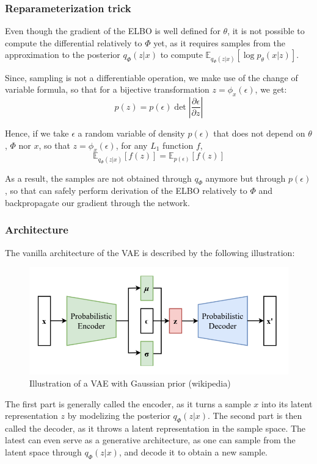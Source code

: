 \subsubsection{Reparameterization trick}

Even though the gradient of the ELBO is well defined for $\theta$, it is not possible to compute the differential relatively to $\Phi$ yet, as it requires samples from the approximation to the posterior $q_{\Phi}(z|x)$ to compute $\mathbb{E}_{q_{\Phi}(z|x)}[\log p_{\theta}(x|z)]$.
\medskip

Since, sampling is not a differentiable operation, we make use of the change of variable formula, so that for a bijective transformation $z = \phi_x(\epsilon)$, we get:
$$
p(z) = p(\epsilon) \det \left| \frac{\partial \epsilon}{\partial z}\right|
$$

Hence, if we take $\epsilon$ a random variable of density $p(\epsilon)$ that does not depend on $\theta$, $\Phi$ nor $x$, so that $z = \phi_x(\epsilon)$, for any $L_1$ function $f$,
$$
\mathbb{E}_{q_{\Phi}(z|x)}[f(z)] = \mathbb{E}_{p(\epsilon)}[f(z)]
$$

As a result, the samples are not obtained through $q_{\Phi}$ anymore but through $p(\epsilon)$, so that can safely perform derivation of the ELBO relatively to $\Phi$ and backpropagate our gradient through the network.

\subsubsection{Architecture}

The vanilla architecture of the VAE is described by the following illustration:

\begin{figure}[H]
    \centering
    \includegraphics[width=.7\textwidth]{images/Reparameterized_Variational_Autoencoder}
    \caption{Illustration of a VAE with Gaussian prior (wikipedia)}
    \label{fig:vae_architecture}
\end{figure}

The first part is generally called the encoder, as it turns a sample $x$ into its latent representation $z$ by modelizing the posterior $q_{\Phi}(z|x)$. The second part is then called the decoder, as it throws a latent representation in the sample space. The latest can even serve as a generative architecture, as one can sample from the latent space through $q_{\Phi}(z|x)$, and decode it to obtain a new sample.
\medskip

